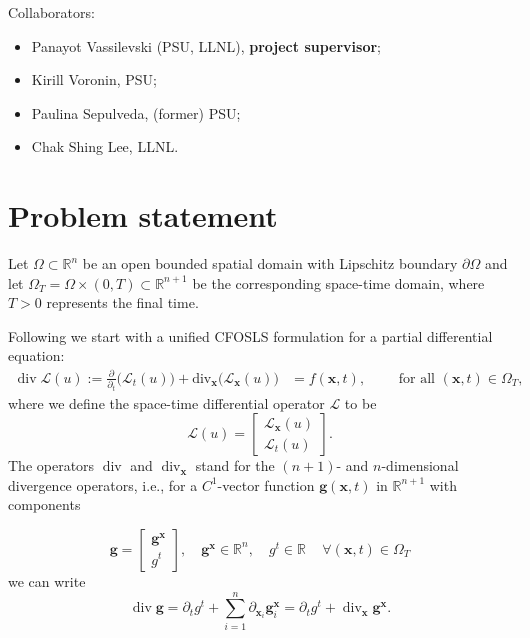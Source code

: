 \documentclass[a4paper,12pt]{amsart}
\numberwithin{equation}{section}
\renewcommand{\div}{\operatorname{div}}
\renewcommand{\L}{{\mathcal L}}
\def\XVec#1{{\mathbf #1}}
\def\Xx{\XVec{x}}
\begin{document}
Collaborators:
\begin{itemize}
	\item Panayot Vassilevski (PSU, LLNL), \textbf{project supervisor};
	\item Kirill Voronin, PSU;
	\item Paulina Sepulveda, (former) PSU;
	\item Chak Shing Lee, LLNL.
\end{itemize}

\section{Problem statement}


\bigskip

Let $\Omega\subset \mathbb{R}^n$ be an open bounded spatial domain with Lipschitz boundary $\partial \Omega$ and let 
$\Omega_{T} = \Omega\times (0,T)\subset \mathbb{R}^{n+1}$ be the corresponding space-time domain,  where $T>0$ represents the final time.  

Following \cite{our_cfosls_paper} we start with a unified CFOSLS formulation for a partial differential equation:
\begin{align} \label{Problem}
\div \L(u) := \frac{\partial}{\partial_t} \big(\L_t(u) \big)+ \mathrm{div}_\Xx \big( \L_\Xx (u)\big)& = f(\Xx, t), \qquad \text{ for all } (\Xx,t) \in \Omega_T,
\end{align}
where we define the space-time differential operator $\L$ to be
\[
\L(u) =  \begin{bmatrix} \L_\Xx(u) \\ \L_t(u) \end{bmatrix}.
\]
The operators $\div$ and $\div_\Xx$ stand for the $(n+1)$- and $n$-dimensional divergence operators, i.e., for a $C^1$-vector function $\mathbf{g}(\Xx,t)$ in $\mathbb{R}^{n+1}$ with components

$$
\mathbf{g} =  \begin{bmatrix} \mathbf{g}^\Xx 
\\ g^t \end{bmatrix}, \quad 
\mathbf{g}^\Xx \in \mathbb{R}^{n}, \quad g^t \in \mathbb{R} \quad \, \forall (\Xx,t) \in \Omega_T
$$
we can write
$$
\div \mathbf{g} = \partial_t g^t + \sum_{i = 1}^{n} \partial_{\Xx_i} \mathbf{g}^{\Xx}_i = \partial_t g^t + \div_\Xx \mathbf{g}^{\Xx}.
$$
\end{document}
